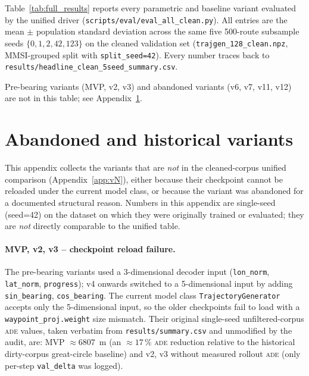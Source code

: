 \documentclass[oneside, a4paper, onecolumn, 11pt]{article}
\newcommand{\ade}{\textsc{ade}}
\begin{document}
Table~\ref{tab:full_results} reports every parametric and baseline
variant evaluated by the unified driver
(\texttt{scripts/eval/eval\_all\_clean.py}).  All entries are the
mean $\pm$ population standard deviation across the same five 500-route
subsample seeds $\{0, 1, 2, 42, 123\}$ on the cleaned validation set
(\texttt{trajgen\_128\_clean.npz}, MMSI-grouped split with
\texttt{split\_seed=42}).  Every number traces back to
\texttt{results/headline\_clean\_5seed\_summary.csv}.

\begin{table}[h]
\centering
\caption{Unified cleaned-corpus ladder.  Mean $\pm$ std over 5
disjoint 500-route subsamples; trained checkpoint held fixed.}
\label{tab:full_results}

\end{table}

Pre-bearing variants (MVP, v2, v3) and abandoned variants (v6, v7,
v11, v12) are not in this table; see
Appendix~\ref{app:abandoned}.

\section{Abandoned and historical variants}\label{app:abandoned}

This appendix collects the variants that are \emph{not} in the
cleaned-corpus unified comparison (Appendix~\ref{app:vN}), either
because their checkpoint cannot be reloaded under the current model
class, or because the variant was abandoned for a documented
structural reason.  Numbers in this appendix are single-seed
(seed=42) on the dataset on which they were originally trained or
evaluated; they are \emph{not} directly comparable to the unified
table.

\paragraph{MVP, v2, v3 -- checkpoint reload failure.}
The pre-bearing variants used a 3-dimensional decoder input
(\texttt{lon\_norm}, \texttt{lat\_norm}, \texttt{progress}); v4
onwards switched to a 5-dimensional input by adding
\texttt{sin\_bearing}, \texttt{cos\_bearing}.  The current model
class \texttt{TrajectoryGenerator} accepts only the 5-dimensional
input, so the older checkpoints fail to load with a
\texttt{waypoint\_proj.weight} size mismatch.  Their original
single-seed unfiltered-corpus \ade{} values, taken verbatim from
\texttt{results/summary.csv} and unmodified by the audit, are:
MVP $\approx 6807$~m (an $\approx 17\,\%$ \ade{} reduction relative
to the historical dirty-corpus great-circle baseline) and v2, v3
without measured rollout \ade{} (only per-step \texttt{val\_delta}
was logged).
\end{document}
